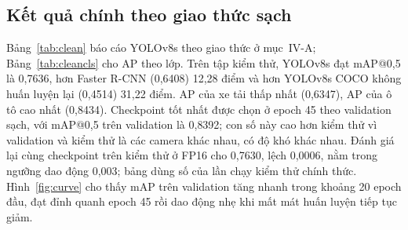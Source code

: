 \documentclass[10pt,journal,letterpaper]{IEEEtran}
\begin{document}
\subsection{Kết quả chính theo giao thức sạch}
Bảng~\ref{tab:clean} báo cáo YOLOv8s theo giao thức ở mục~IV-A; Bảng~\ref{tab:cleancls} cho AP theo lớp. Trên tập kiểm thử, YOLOv8s đạt mAP@0,5 là 0,7636, hơn Faster R-CNN (0,6408) 12,28 điểm và hơn YOLOv8s COCO không huấn luyện lại (0,4514) 31,22 điểm. AP của xe tải thấp nhất (0,6347), AP của ô tô cao nhất (0,8434). Checkpoint tốt nhất được chọn ở epoch 45 theo validation sạch, với mAP@0,5 trên validation là 0,8392; con số này cao hơn kiểm thử vì validation và kiểm thử là các camera khác nhau, có độ khó khác nhau. Đánh giá lại cùng checkpoint trên kiểm thử ở FP16 cho 0,7630, lệch 0,0006, nằm trong ngưỡng dao động 0,003; bảng dùng số của lần chạy kiểm thử chính thức. Hình~\ref{fig:curve} cho thấy mAP trên validation tăng nhanh trong khoảng 20 epoch đầu, đạt đỉnh quanh epoch 45 rồi dao động nhẹ khi mất mát huấn luyện tiếp tục giảm.
\end{document}

